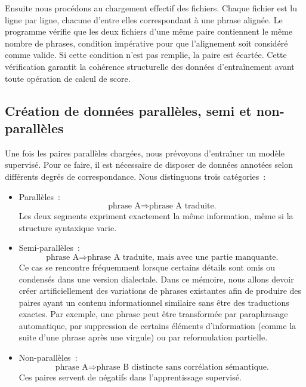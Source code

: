 Ensuite nous procédons au chargement effectif des fichiers. Chaque fichier est 
lu ligne par ligne, chacune d'entre elles correspondant à une phrase alignée. Le programme vérifie que les deux 
fichiers d'une même paire contiennent le même nombre de phrases, condition impérative pour que l'alignement 
soit considéré comme valide. Si cette condition n'est pas remplie, la paire est écartée. Cette vérification garantit
la cohérence structurelle des données d'entraînement avant toute opération de calcul de score.

\subsection{Création de données parallèles, semi et non-parallèles}

Une fois les paires parallèles chargées, nous prévoyons d'entraîner un modèle supervisé. 
Pour ce faire, il est nécessaire de disposer de
données annotées selon différents degrés de correspondance. Nous distinguons trois catégories~:

\begin{itemize}
    \item Parallèles~:
    \[
    \text{phrase A} \Rightarrow \text{phrase A traduite.}
    \]
    Les deux segments expriment exactement la même information, même si la structure syntaxique varie.
    
    \item Semi-parallèles~:
    \[
    \text{phrase A} \Rightarrow \text{phrase A traduite, mais avec une partie manquante.}
    \]
    Ce cas se rencontre fréquemment lorsque certains détails sont omis ou condensés dans une version dialectale.
    Dans ce mémoire, nous allons devoir créer artificiellement des variations de phrases existantes afin
    de produire des paires ayant un contenu informationnel similaire sans être des traductions exactes.
    Par exemple, une phrase peut être transformée par paraphrasage automatique, par suppression de certains
    éléments d’information (comme la suite d'une phrase après une virgule) ou par reformulation partielle.
    
    \item Non-parallèles~:
    \[
    \text{phrase A} \Rightarrow \text{phrase B distincte sans corrélation sémantique.}
    \]
    Ces paires servent de négatifs dans l’apprentissage supervisé.
\end{itemize}

